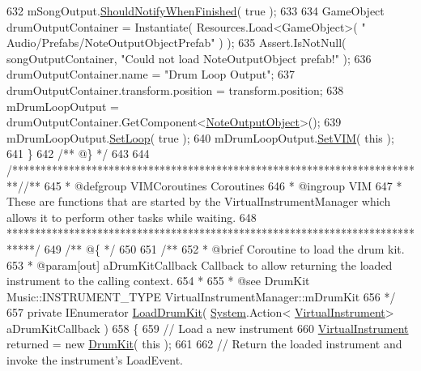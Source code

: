 \begin{DoxyCodeInclude}
632         mSongOutput.\hyperlink{group___n_o_o_pub_func_gab7bad1b7d462676843be9e0bbfa1c9fb}{ShouldNotifyWhenFinished}( \textcolor{keyword}{true} );
633 
634         GameObject drumOutputContainer = Instantiate( Resources.Load<GameObject>( \textcolor{stringliteral}{"
      Audio/Prefabs/NoteOutputObjectPrefab"} ) );
635         Assert.IsNotNull( songOutputContainer, \textcolor{stringliteral}{"Could not load NoteOutputObject prefab!"} );
636         drumOutputContainer.name = \textcolor{stringliteral}{"Drum Loop Output"};
637         drumOutputContainer.transform.position = transform.position;
638         mDrumLoopOutput = drumOutputContainer.GetComponent<\hyperlink{class_note_output_object}{NoteOutputObject}>();
639         mDrumLoopOutput.\hyperlink{group___n_o_o_pub_func_ga7b79bbd2c7a68831b322edff140f29d2}{SetLoop}( \textcolor{keyword}{true} );
640         mDrumLoopOutput.\hyperlink{group___n_o_o_pub_func_gaca261a6f8d95fc7f81bbc3c8108bad58}{SetVIM}( \textcolor{keyword}{this} );
641     \}\textcolor{comment}{}
642 \textcolor{comment}{    /** @\} */}
643 
644     \textcolor{comment}{/*************************************************************************/}\textcolor{comment}{/** }
645 \textcolor{comment}{    * @defgroup VIMCoroutines Coroutines}
646 \textcolor{comment}{    * @ingroup VIM}
647 \textcolor{comment}{    * These are functions that are started by the VirtualInstrumentManager which allows it to perform other
       tasks while waiting.}
648 \textcolor{comment}{    *****************************************************************************/}\textcolor{comment}{}
649 \textcolor{comment}{    /** @\{ */}
650 \textcolor{comment}{}
651 \textcolor{comment}{    /** }
652 \textcolor{comment}{     * @brief Coroutine to load the drum kit. }
653 \textcolor{comment}{     * @param[out] aDrumKitCallback Callback to allow returning the loaded instrument to the calling
       context.}
654 \textcolor{comment}{     * }
655 \textcolor{comment}{     * @see DrumKit Music::INSTRUMENT\_TYPE VirtualInstrumentManager::mDrumKit}
656 \textcolor{comment}{    */} 
657     \textcolor{keyword}{private} IEnumerator \hyperlink{group___v_i_m_coroutines_gaba165ca4757b6c8555914fe6b42b638d}{LoadDrumKit}( \hyperlink{namespace_system}{System}.Action<
      \hyperlink{class_virtual_instrument}{VirtualInstrument}> aDrumKitCallback )
658     \{
659         \textcolor{comment}{// Load a new instrument}
660         \hyperlink{class_virtual_instrument}{VirtualInstrument} returned = \textcolor{keyword}{new} \hyperlink{class_drum_kit}{DrumKit}( \textcolor{keyword}{this} );
661 
662         \textcolor{comment}{// Return the loaded instrument and invoke the instrument's LoadEvent.}

\end{DoxyCodeInclude}

